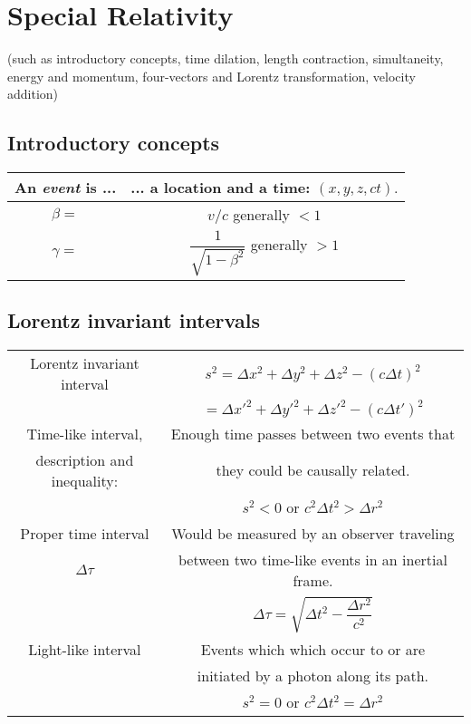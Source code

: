 
\section{Special Relativity}
(such as introductory concepts, time dilation,
length contraction, simultaneity,
energy and momentum, four-vectors
and Lorentz transformation,
velocity addition)

\subsection{Introductory concepts} 
\center
\begin{tabular}{|c|c|}
\hline

 An \textit{event} is ... & ... a location and a time: $(x, y, z, c t).$

\\ \hline

$\beta =$ & $v/c$ generally $<1$

\\ \hline

$\gamma = $ & $\dfrac{1}{\sqrt{1 - \beta^2}}$ generally $>1$

\\ \hline
\end{tabular}
\flushleft


\subsection{Lorentz invariant intervals}
\center
\begin{tabular}{|c|c|}
\hline

Lorentz invariant interval & $ s^2 = \Delta x^2 + \Delta y^2 + \Delta z^2 - (c \Delta t)^2 $\\
& $ = \Delta x'^2 + \Delta y'^2 + \Delta z'^2 - (c \Delta t')^2$

\\ \hline

Time-like interval,  & Enough time passes between two events that \\ 
description and inequality:  &they could be causally related. \\
& $s^2 < 0$ or $c^2 \Delta t^2 > \Delta r^2$

\\ \hline

Proper time interval & Would be measured by an observer traveling\\
$\Delta \tau $ & between two time-like events in an inertial frame.  \\
 & $ \Delta \tau = \sqrt{\Delta t^2 - \dfrac{ \Delta r^2}{c^2}} $

\\ \hline

Light-like interval & Events which which occur to or are \\
 & initiated by a photon along its path. \\
 & $s^2 = 0 $ or $c^2 \Delta t^2 = \Delta r^2$

\\ \hline

\end{tabular}

